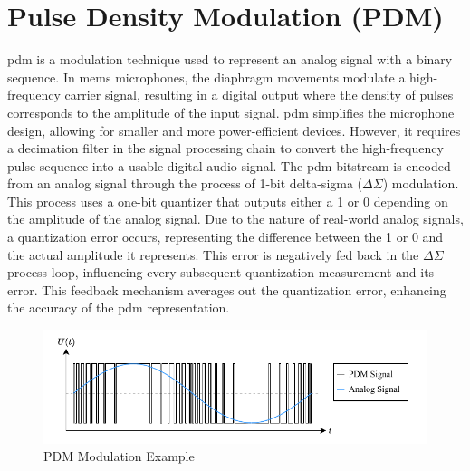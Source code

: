 \section{Pulse Density Modulation (PDM)}
\acrfull{pdm} is a modulation technique used to represent an analog signal with a binary sequence.
In \acrshort{mems} microphones, the diaphragm movements modulate a high-frequency carrier signal,
resulting in a digital output where the density of pulses corresponds to the amplitude of the input signal.
\acrshort{pdm} simplifies the microphone design, allowing for smaller and more power-efficient devices.
However, it requires a decimation filter in the signal processing chain to convert the high-frequency pulse sequence into a usable digital audio signal.
The \acrshort{pdm} bitstream is encoded from an analog signal through the process of 1-bit delta-sigma (\(\Delta \Sigma\)) modulation.
This process uses a one-bit quantizer that outputs either a 1 or 0 depending on the amplitude of the analog signal.
Due to the nature of real-world analog signals, a quantization error occurs, representing the difference between the 1 or 0 and the actual amplitude it represents.
This error is negatively fed back in the \(\Delta \Sigma\) process loop, influencing every subsequent quantization measurement and its error.
This feedback mechanism averages out the quantization error, enhancing the accuracy of the \acrshort{pdm} representation.
\begin{figure}[h]
	\centering
	\includegraphics[width=1.0\textwidth]{images/2_preliminaries/pdm_modulation.pdf}
	\caption{PDM Modulation Example}
	\label{fig:pdm_modulation}
\end{figure}


